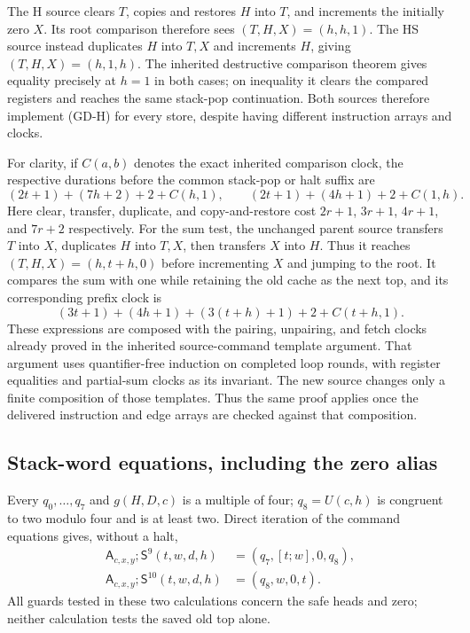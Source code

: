 The H source clears $T$, copies and restores $H$ into $T$, and increments
the initially zero $X$.  Its root comparison therefore sees
$(T,H,X)=(h,h,1)$.  The HS source instead duplicates $H$ into $T,X$ and
increments $H$, giving $(T,H,X)=(h,1,h)$.  The inherited destructive
comparison theorem gives equality precisely at $h=1$ in both cases;
on inequality it clears the compared registers and reaches the same
stack-pop continuation.  Both sources therefore implement (GD-H) for
every store, despite having different instruction arrays and clocks.

For clarity, if $C(a,b)$ denotes the exact inherited comparison clock,
the respective durations before the common stack-pop or halt suffix are
\[
 (2t+1)+(7h+2)+2+C(h,1),\qquad
 (2t+1)+(4h+1)+2+C(1,h).
\]
Here clear, transfer, duplicate, and copy-and-restore cost
$2r+1$, $3r+1$, $4r+1$, and $7r+2$ respectively.  For the sum test,
the unchanged parent source transfers $T$ into $X$, duplicates $H$ into
$T,X$, then transfers $X$ into $H$.  Thus it reaches
$(T,H,X)=(h,t+h,0)$ before incrementing $X$ and jumping to the root.
It compares the sum with one while retaining the old cache as the next
top, and its corresponding prefix clock is
\[
          (3t+1)+(4h+1)+(3(t+h)+1)+2+C(t+h,1).
\]
These expressions are composed with the pairing, unpairing, and fetch
clocks already proved in the inherited source-command template argument.
That argument uses quantifier-free induction on completed loop rounds,
with register equalities and partial-sum clocks as its invariant.  The
new source changes only a finite composition of those templates.  Thus
the same proof applies once the delivered instruction and edge arrays
are checked against that composition.

\subsection{Stack-word equations, including the zero alias}

Every $q_0,\ldots,q_7$ and $g(H,D,c)$ is a multiple of four;
$q_8=U(c,h)$ is congruent to two modulo four and is at least two.
Direct iteration of the command equations gives, without a halt,
\begin{align*}
 \mathsf A_{c,x,y};\mathsf S^9(t,w,d,h)
    &=(q_7,[t;w],0,q_8),\\
 \mathsf A_{c,x,y};\mathsf S^{10}(t,w,d,h)
    &=(q_8,w,0,t).
\end{align*}
All guards tested in these two calculations concern the safe heads and
zero; neither calculation tests the saved old top alone.

